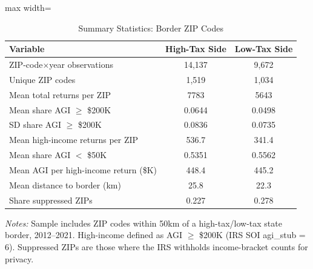\begin{table}[htbp]
\centering
\caption{Summary Statistics: Border ZIP Codes}
\label{tab:summary}
\begin{adjustbox}{max width=\textwidth}
\begin{tabular}{lcc}
  \hline
Variable & High-Tax Side & Low-Tax Side \\ 
  \hline
ZIP-code$\times$year observations & 14,137 & 9,672 \\ 
  Unique ZIP codes & 1,519 & 1,034 \\ 
  Mean total returns per ZIP & 7783 & 5643 \\ 
  Mean share AGI $\geq$ \$200K & 0.0644 & 0.0498 \\ 
  SD share AGI $\geq$ \$200K & 0.0836 & 0.0735 \\ 
  Mean high-income returns per ZIP & 536.7 & 341.4 \\ 
  Mean share AGI $<$ \$50K & 0.5351 & 0.5562 \\ 
  Mean AGI per high-income return (\$K) & 448.4 & 445.2 \\ 
  Mean distance to border (km) & 25.8 & 22.3 \\ 
  Share suppressed ZIPs & 0.227 & 0.278 \\ 
   \hline
\end{tabular}
\end{adjustbox}
\begin{tablenotes}\small
\item \textit{Notes:} Sample includes ZIP codes within 50km of a high-tax/low-tax state border, 2012--2021. High-income defined as AGI $\geq$ \$200K (IRS SOI agi\_stub = 6). Suppressed ZIPs are those where the IRS withholds income-bracket counts for privacy.
\end{tablenotes}
\end{table}
